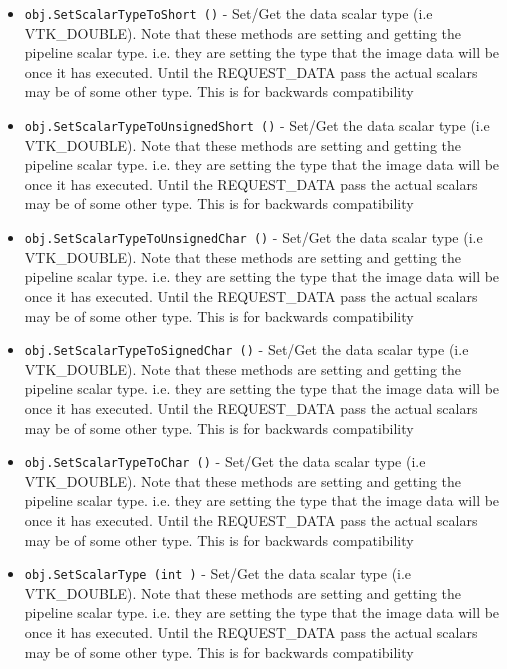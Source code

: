 \begin{itemize}
\item  \verb|obj.SetScalarTypeToShort ()| -  Set/Get the data scalar type (i.e VTK\_DOUBLE). Note that these methods
 are setting and getting the pipeline scalar type. i.e. they are setting
 the type that the image data will be once it has executed. Until the
 REQUEST\_DATA pass the actual scalars may be of some other type. This is
 for backwards compatibility

\item  \verb|obj.SetScalarTypeToUnsignedShort ()| -  Set/Get the data scalar type (i.e VTK\_DOUBLE). Note that these methods
 are setting and getting the pipeline scalar type. i.e. they are setting
 the type that the image data will be once it has executed. Until the
 REQUEST\_DATA pass the actual scalars may be of some other type. This is
 for backwards compatibility

\item  \verb|obj.SetScalarTypeToUnsignedChar ()| -  Set/Get the data scalar type (i.e VTK\_DOUBLE). Note that these methods
 are setting and getting the pipeline scalar type. i.e. they are setting
 the type that the image data will be once it has executed. Until the
 REQUEST\_DATA pass the actual scalars may be of some other type. This is
 for backwards compatibility

\item  \verb|obj.SetScalarTypeToSignedChar ()| -  Set/Get the data scalar type (i.e VTK\_DOUBLE). Note that these methods
 are setting and getting the pipeline scalar type. i.e. they are setting
 the type that the image data will be once it has executed. Until the
 REQUEST\_DATA pass the actual scalars may be of some other type. This is
 for backwards compatibility

\item  \verb|obj.SetScalarTypeToChar ()| -  Set/Get the data scalar type (i.e VTK\_DOUBLE). Note that these methods
 are setting and getting the pipeline scalar type. i.e. they are setting
 the type that the image data will be once it has executed. Until the
 REQUEST\_DATA pass the actual scalars may be of some other type. This is
 for backwards compatibility

\item  \verb|obj.SetScalarType (int )| -  Set/Get the data scalar type (i.e VTK\_DOUBLE). Note that these methods
 are setting and getting the pipeline scalar type. i.e. they are setting
 the type that the image data will be once it has executed. Until the
 REQUEST\_DATA pass the actual scalars may be of some other type. This is
 for backwards compatibility


\end{itemize}
